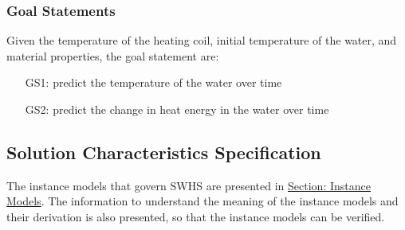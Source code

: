 \documentclass[12pt]{article}
\begin{document}
\subsubsection{Goal Statements}
\label{Sec:GoalStmt}
Given the temperature of the heating coil, initial temperature of the water, and material properties, the goal statement are:
\begin{itemize}
\item[GS1:]predict the temperature of the water over time
\item[GS2:]predict the change in heat energy in the water over time
\end{itemize}
\subsection{Solution Characteristics Specification}
\label{Sec:SolCharSpec}
The instance models that govern SWHS are presented in \hyperref[Sec:IMs]{Section: Instance Models}. The information to understand the meaning of the instance models and their derivation is also presented, so that the instance models can be verified.
\end{document}
